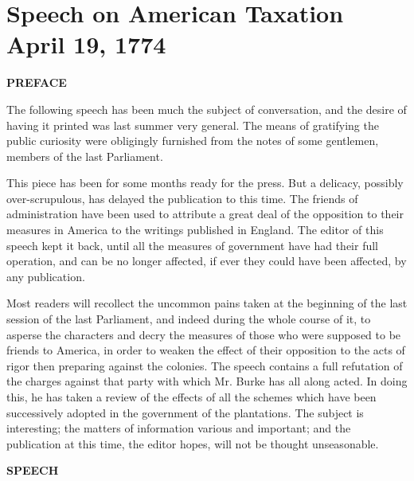 \chapter*[Speech on American Taxation]{Speech on American Taxation
\\ \vspace{0.1cm}\large{April 19, 1774}}

\begin{center}
  \textbf{\large PREFACE} \par 
\end{center}

The following speech has been much the subject of conversation, and the desire of having it printed was last summer very general. The means of gratifying the public curiosity were obligingly furnished from the notes of some gentlemen, members of the last Parliament.

This piece has been for some months ready for the press. But a delicacy, possibly over-scrupulous, has delayed the publication to this time. The friends of administration have been used to attribute a great deal of the opposition to their measures in America to the writings published in England. The editor of this speech kept it back, until all the measures of government have had their full operation, and can be no longer affected, if ever they could have been affected, by any publication.

Most readers will recollect the uncommon pains taken at the beginning of the last session of the last Parliament, and indeed during the whole course of it, to asperse the characters and decry the measures of those who were supposed to be friends to America, in order to weaken the effect of their opposition to the acts of rigor then preparing against the colonies. The speech contains a full refutation of the charges against that party with which Mr. Burke has all along acted. In doing this, he has taken a review of the effects of all the schemes which have been successively adopted in the government of the plantations. The subject is interesting; the matters of information various and important; and the publication at this time, the editor hopes, will not be thought unseasonable.

\begin{center}
  \textbf{\large SPEECH} \par 
\end{center}

